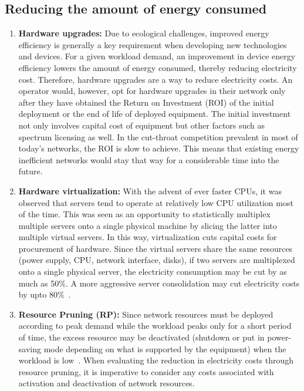 \subsection{Reducing the amount of energy consumed}
\begin{enumerate}
\item \textbf{Hardware upgrades:} Due to ecological challenges, improved energy efficiency is generally a key requirement when developing new technologies and devices. For a given workload demand, an improvement in device energy efficiency lowers the amount of energy consumed, thereby reducing electricity cost. Therefore, hardware upgrades are a way to reduce electricity costs. An operator would, however, opt for hardware upgrades in their network only after they have obtained the Return on Investment (ROI) of the initial deployment or the end of life of deployed equipment. The initial investment not only involves capital cost of equipment but other factors such as spectrum licensing as well. In the cut-throat competition prevalent in most of today's networks, the ROI is slow to achieve. This means that existing energy inefficient networks would stay that way for a considerable time into the future.
\item \textbf{Hardware virtualization:} With the advent of ever faster CPUs, it was observed that servers tend to operate at relatively low CPU utilization most of the time. This was seen as an opportunity to statistically multiplex multiple servers onto a single physical machine by slicing the latter into multiple virtual servers. In this way, virtualization cuts capital costs for procurement of hardware. Since the virtual servers share the same resources (power supply, CPU, network interface, disks), if two servers are multiplexed onto a single physical server, the electricity consumption may be cut by as much as 50\%. A more aggressive server consolidation may cut electricity costs by upto 80\%~\cite{VirtualizationCutsPower}.
\item \textbf{Resource Pruning (RP):} Since network resources must be deployed according to peak demand while the workload peaks only for a short period of time, the excess resource may be deactivated (shutdown or put in power-saving mode depending on what is supported by the equipment) when the workload is low~\cite{Chase:2001:MES:502059.502045,Chen:2008:ESP:1387589.1387613,Meisner:2009:PES:1508244.1508269,Lin_dynamicright-sizing,Peng:2011:TPS:2030613.2030628}. When evaluating the reduction in electricity costs through resource pruning, it is imperative to consider any costs associated with activation and deactivation of network resources.
\end{enumerate}

